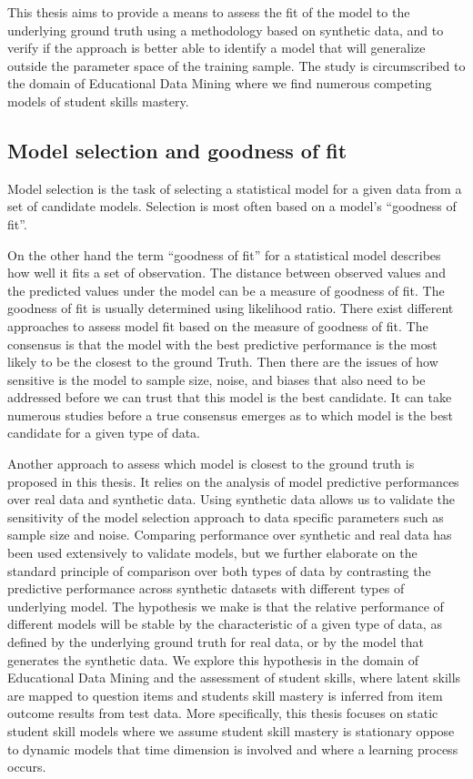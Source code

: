 This thesis aims to provide a means to assess the fit of the model to the underlying ground truth using a methodology based on synthetic data, and to verify if the approach is better able to identify a model that will generalize outside the parameter space of the training sample. The study is circumscribed to the domain of Educational Data Mining where we find numerous competing models of student skills mastery.

\subsection{Model selection and goodness of fit}

Model selection is the task of selecting a statistical model for a given data from a set of candidate models. Selection is most often based on a model's ``goodness of fit''.

On the other hand the term ``goodness of fit'' for a statistical model describes how well it fits a set of observation. The distance between observed values and the predicted values under the model can be a measure of goodness of fit. The goodness of fit is usually determined using likelihood ratio. There exist different approaches to assess model fit based on the measure of goodness of fit. The consensus is that the model with the best predictive performance is the most likely to be the closest to the ground Truth. Then there are the issues of how sensitive is the model to sample size, noise, and biases that also need to be addressed before we can trust that this model is the best candidate. It can take numerous studies before a true consensus emerges as to which model is the best candidate for a given type of data.

Another approach to assess which model is closest to the ground truth is proposed in this thesis. It relies on the analysis of model predictive performances over real data and synthetic data. Using synthetic data allows us to validate the sensitivity of the model selection approach to data specific parameters such as sample size and noise. Comparing performance over synthetic and real data has been used extensively to validate models, but we further elaborate on the standard principle of comparison over both types of data by contrasting the predictive performance across synthetic datasets with different types of underlying model. The hypothesis we make is that the relative performance of different models will be stable by the characteristic of a given type of data, as defined by the underlying ground truth for real data, or by the model that generates the synthetic data. We explore this hypothesis in the domain of Educational Data Mining and the assessment of student skills, where latent skills are mapped to question items and students skill mastery is inferred from item outcome results from test data. More specifically, this thesis focuses on static student skill models where we assume student skill mastery is stationary oppose to dynamic models that time dimension is involved and where a learning process occurs.

